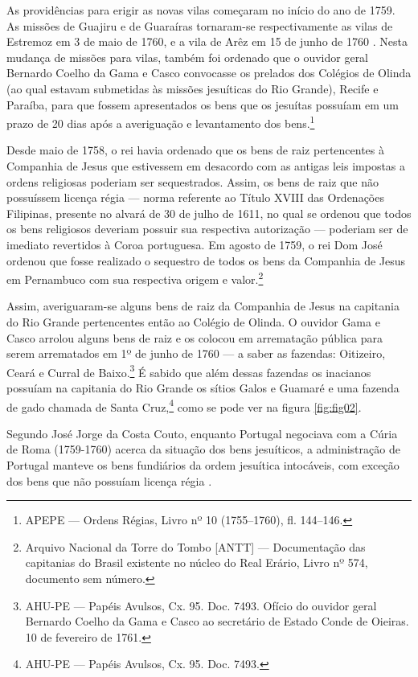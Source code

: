 \begin{refsection}
As providências para erigir as novas vilas começaram no início do ano de 1759. As missões de Guajiru e de Guaraíras tornaram-se respectivamente as vilas de Estremoz em 3 de maio de 1760, e a vila de Arêz em 15 de junho de 1760 \cite[p.~122--123]{Lopes2005}. Nesta mudança de missões para vilas, também foi ordenado que o ouvidor geral Bernardo Coelho da Gama e Casco convocasse os prelados dos Colégios de Olinda (ao qual estavam submetidas às missões jesuíticas do Rio Grande), Recife e Paraíba, para que fossem apresentados os bens que os jesuítas possuíam em um prazo de 20 dias após a averiguação e levantamento dos bens.\footnote{APEPE --- Ordens Régias, Livro nº 10 (1755--1760), fl. 144--146.} 

Desde maio de 1758, o rei havia ordenado que os bens de raiz pertencentes à Companhia de Jesus que estivessem em desacordo com as antigas leis impostas a ordens religiosas poderiam ser sequestrados. Assim, os bens de raiz que não possuíssem licença régia --- norma referente ao Título XVIII das Ordenações Filipinas, presente no alvará de 30 de julho de 1611, no qual se ordenou que todos os bens religiosos deveriam possuir sua respectiva autorização --- poderiam ser de imediato revertidos à Coroa portuguesa. Em agosto de 1759, o rei Dom José ordenou que fosse realizado o sequestro de todos os bens da Companhia de Jesus em Pernambuco com sua respectiva origem e valor.\footnote{Arquivo Nacional da Torre do Tombo [ANTT] --- Documentação das capitanias do Brasil existente no núcleo do Real Erário, Livro nº 574, documento sem número. }

Assim, averiguaram-se alguns bens de raiz da Companhia de Jesus na capitania do Rio Grande pertencentes então ao Colégio de Olinda. O ouvidor Gama e Casco arrolou alguns bens de raiz e os colocou em arrematação pública para serem arrematados em 1º de junho de 1760 --- a saber as fazendas: Oitizeiro, Ceará e Curral de Baixo.\footnote{AHU-PE --- Papéis Avulsos, Cx. 95. Doc. 7493. Ofício do ouvidor geral Bernardo Coelho da Gama e Casco ao secretário de Estado Conde de Oieiras. 10 de fevereiro de 1761.} É sabido que além dessas fazendas os inacianos possuíam na capitania do Rio Grande os sítios Galos e Guamaré e uma fazenda de gado chamada de Santa Cruz,\footnote{AHU-PE --- Papéis Avulsos, Cx. 95. Doc. 7493.} como se pode ver na figura \ref{fig:fig02}.  

Segundo José Jorge da Costa Couto, enquanto Portugal negociava com a Cúria de Roma (1759-1760) acerca da situação dos bens jesuíticos, a administração de Portugal manteve os bens fundiários da ordem jesuítica intocáveis, com exceção dos bens que não possuíam licença régia \cite[p.~149]{Couto1990}.   


\end{refsection}
